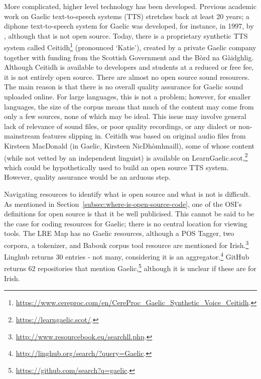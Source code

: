 More complicated, higher level technology has been developed. Previous academic work on Gaelic text-to-speech systems (TTS) stretches back at least 20 years; a diphone text-to-speech system for Gaelic was developed, for instance, in 1997, by \citet{wolters1997diphone}, although that is not open source. Today, there is a proprietary synthetic TTS system called Ceitidh\footnote{\href{https://www.cereproc.com/en/CereProc_Gaelic_Synthetic_Voice_Ceitidh}{https://www.cereproc.com/en/CereProc\_Gaelic\_Synthetic\_Voice\_Ceitidh}. } (pronounced `Katie'), created by a private Gaelic company together with funding from the Scottish Government and the B\`ord na G\`aidghlig. Although Ceitidh is available to developers and students at a reduced or free fee, it is not entirely open source. There are almost no open source sound resources. The main reason is that there is no overall quality assurance for Gaelic sound uploaded online. For large languages, this is not a problem; however, for smaller languages, the size of the corpus means that much of the content may come from only a few sources, none of which may be ideal. This issue may involve general lack of relevance of sound files, or poor quality recordings, or any dialect or non-mainstream features slipping in. Ceitidh was based on original audio files from Kirsteen MacDonald (in Gaelic, Kirsteen NicDh\`{o}mhnaill), some of whose content (while not vetted by an independent linguist) is available on LearnGaelic.scot,\footnote{\href{https://learngaelic.scot/}{https://learngaelic.scot/}. } which could be hypothetically used to build an open source TTS system. However, quality assurance would be an arduous step.

Navigating resources to identify what is open source and what is not is difficult. As mentioned in Section~\ref{subsec:where-is-open-source-code}, one of the OSI's definitions for open source is that it be well publicised. This cannot be said to be the case for coding resources for Gaelic; there is no central location for viewing tools. The LRE Map has no Gaelic resources, although a POS Tagger, two corpora, a tokenizer, and Babouk corpus tool resource are mentioned for Irish.\footnote{\href{http://www.resourcebook.eu/searchll.php}{http://www.resourcebook.eu/searchll.php}. } Linghub returns 30 entries - not many, considering it is an aggregator.\footnote{\href{http://linghub.org/search/?query=Gaelic}{http://linghub.org/search/?query=Gaelic}. } GitHub returns 62 repositories that mention Gaelic,\footnote{\href{https://github.com/search?q=gaelic}{https://github.com/search?q=gaelic}. } although it is unclear if these are for Irish.


